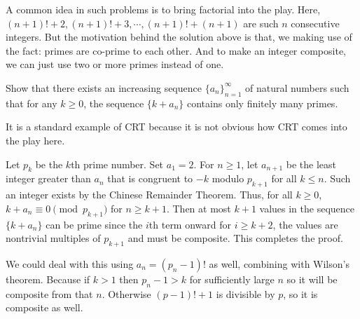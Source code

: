 \documentclass{subfile}
\begin{document}
	\begin{note}
		A common idea in such problems is to bring factorial into the play. Here, $(n+1)!+2,(n+1)!+3,\cdots,(n+1)!+(n+1)$ are such $n$ consecutive integers. But the motivation behind the solution above is that, we making use of the fact: primes are co-prime to each other. And to make an integer composite, we can just use two or more primes instead of one.
	\end{note}
	
	\begin{problem}
		Show that there exists an increasing sequence $\{a_{n}\}_{n=1}^{\infty}$ of natural numbers such that for any $k \geq  0$, the sequence $\{k+a_{n}\}$ contains only finitely many primes.
	\end{problem}
	It is a standard example of CRT because it is not obvious how CRT comes into the play here.
	\begin{solution}
		Let $p_{k}$ be the $k$th prime number. Set ${a_1}= 2$. For	$n \geq  1$, let $a_{n+1}$ be the least integer greater than $a_{n}$ that is congruent to $-k$ modulo $p_{k+1}$ for all $k \leq  n$. Such an integer exists by the Chinese Remainder
		Theorem. Thus, for all $k \geq 0$, $k+a_{n}\equiv 0\pmod{p_{k+1}}$ for $n \geq  k + 1$. Then at most $k+1$ values in the sequence $\{k+a_{n}\}$ can be prime since the $i$th term onward for $i\geq k+2$, the values are nontrivial multiples of $p_{k+1}$ and must be composite. This completes the proof.
	\end{solution}
	
	\begin{note}
		We could deal with this using $a_n=(p_n-1)!$ as well, combining with Wilson's theorem. Because if $k>1$ then $p_n-1>k$ for sufficiently large $n$ so it will be composite from that $n$. Otherwise $(p-1)!+1$ is divisible by $p$, so it is composite as well.
	\end{note}
\end{document}
